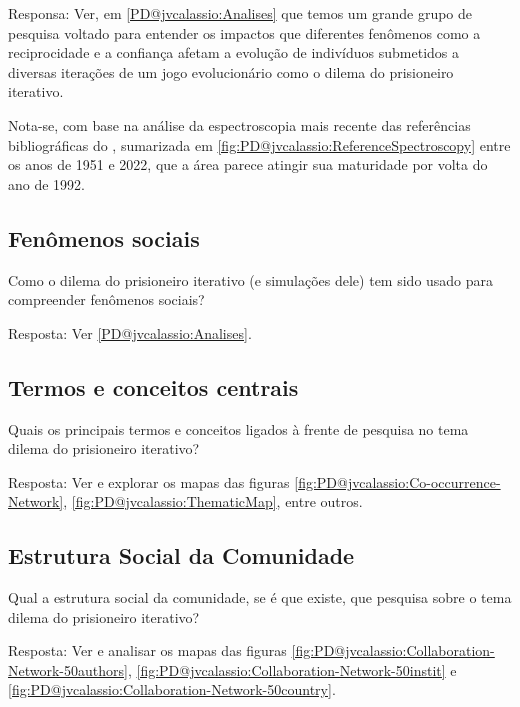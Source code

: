 Responsa: Ver, em \ref{PD@jvcalassio:Analises} que temos um grande grupo de pesquisa voltado para entender os impactos que diferentes fenômenos como a reciprocidade e a confiança afetam a evolução de indivíduos submetidos a diversas iterações de um jogo evolucionário como o dilema do prisioneiro iterativo.

Nota-se, com base na análise da espectroscopia mais recente das referências bibliográficas do \dataset, sumarizada em \ref{fig:PD@jvcalassio:ReferenceSpectroscopy} entre os anos de 1951 e 2022, que a área parece atingir sua maturidade por volta do ano de 1992.

\subsection{Fenômenos sociais}
   
Como o dilema do prisioneiro iterativo (e simulações dele) tem sido usado para compreender fenômenos sociais? 

Resposta: Ver \ref{PD@jvcalassio:Analises}.

\subsection{Termos e conceitos centrais}

Quais os principais termos e conceitos ligados à frente de pesquisa no tema dilema do prisioneiro iterativo? 

Resposta: Ver e explorar os mapas das figuras \ref{fig:PD@jvcalassio:Co-occurrence-Network}, \ref{fig:PD@jvcalassio:ThematicMap}, entre outros.

\subsection{Estrutura Social da Comunidade}

Qual a estrutura social da comunidade, se é que existe, que pesquisa sobre o tema dilema do prisioneiro iterativo?

Resposta: Ver e analisar os mapas das figuras \ref{fig:PD@jvcalassio:Collaboration-Network-50authors}, \ref{fig:PD@jvcalassio:Collaboration-Network-50instit} e \ref{fig:PD@jvcalassio:Collaboration-Network-50country}.
